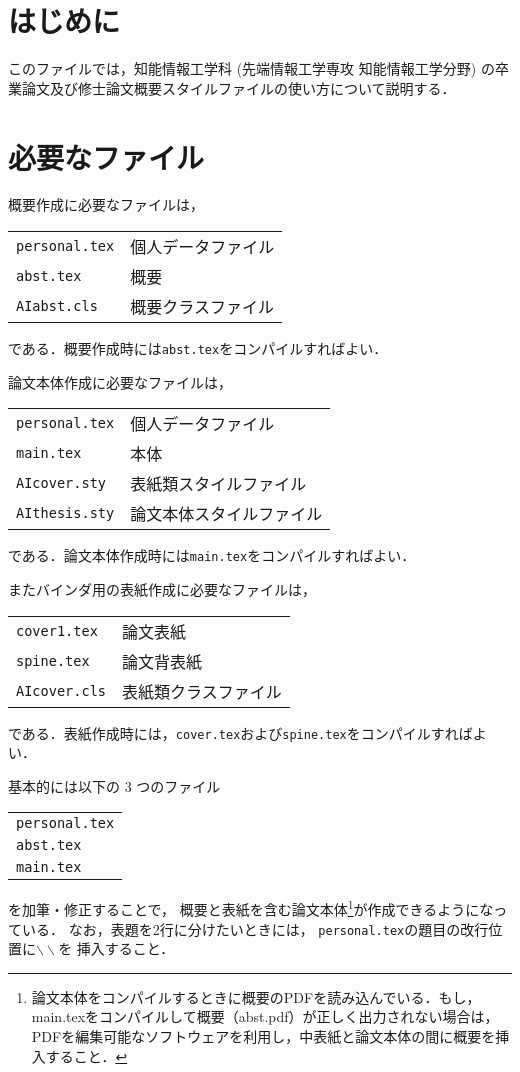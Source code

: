 \documentclass[master]{AIabst} %
\begin{document}
\makeAbstHeader
%
%
%
\section{はじめに}
このファイルでは，知能情報工学科 (先端情報工学専攻 知能情報工学分野) の卒業論文及び修士論文概要スタイルファイルの使い方について説明する．

\section{必要なファイル}
概要作成に必要なファイルは， 
\begin{center}
\begin{tabular}{ll}
{\tt personal.tex\/} & 個人データファイル\\
{\tt abst.tex\/} & 概要\\
{\tt AIabst.cls\/} & 概要クラスファイル
\end{tabular}
\end{center}
である．概要作成時には{\tt abst.tex\/}をコンパイルすればよい．

論文本体作成に必要なファイルは，
\begin{center}
\begin{tabular}{ll}
{\tt personal.tex\/} & 個人データファイル\\
{\tt main.tex\/} & 本体\\
{\tt AIcover.sty\/}  & 表紙類スタイルファイル\\
{\tt AIthesis.sty\/} & 論文本体スタイルファイル
\end{tabular}
\end{center}
である．論文本体作成時には{\tt main.tex\/}をコンパイルすればよい．

またバインダ用の表紙作成に必要なファイルは，
\begin{center}
\begin{tabular}{ll}
{\tt cover1.tex\/} & 論文表紙\\
{\tt spine.tex\/}  & 論文背表紙 \\
{\tt AIcover.cls\/}  & 表紙類クラスファイル
\end{tabular}
\end{center}
である．表紙作成時には，{\tt cover.tex\/}および{\tt spine.tex\/}をコンパイルすればよい．

基本的には以下の 3 つのファイル
\begin{center}
\begin{tabular}{l}
{\tt personal.tex\/} \\
{\tt abst.tex\/} \\
{\tt main.tex\/}
\end{tabular}
\end{center}
を加筆・修正することで，
概要と表紙を含む論文本体\footnote{論文本体をコンパイルするときに概要のPDFを読み込んでいる．もし，main.texをコンパイルして概要（abst.pdf）が正しく出力されない場合は，PDFを編集可能なソフトウェアを利用し，中表紙と論文本体の間に概要を挿入すること．}が作成できるようになっている． 
なお，表題を2行に分けたいときには，
{\tt personal.tex\/}の題目の改行位置に$\backslash\backslash$を
挿入すること．
\end{document}
